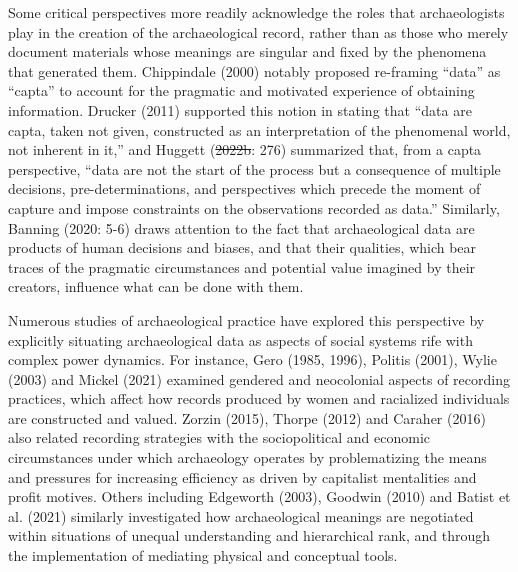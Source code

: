 \documentclass[
]{article}
\makeatletter
\providecommand{\DIFadd}[1]{{\protect\color{blue}\uwave{#1}}} %
\providecommand{\DIFdel}[1]{{\protect\color{red}\sout{#1}}} %
\providecommand{\DIFaddbegin}{} %
\providecommand{\DIFaddend}{} %
\providecommand{\DIFdelbegin}{} %
\providecommand{\DIFdelend}{} %
\newcommand{\DIFscaledelfig}{0.5}
\newlength{\DIFdelgraphicswidth} %
\newlength{\DIFdelgraphicsheight} %
\newcommand{\DIFaddincludegraphics}[2][]{{\color{blue}\fbox{\DIFOincludegraphics[#1]{#2}}}} %
\newcommand{\DIFdelincludegraphics}[2][]{%
\sbox{\DIFdelgraphicsbox}{\DIFOincludegraphics[#1]{#2}}%
\settoboxwidth{\DIFdelgraphicswidth}{\DIFdelgraphicsbox} %
\settoboxtotalheight{\DIFdelgraphicsheight}{\DIFdelgraphicsbox} %
\scalebox{\DIFscaledelfig}{%
\parbox[b]{\DIFdelgraphicswidth}{\usebox{\DIFdelgraphicsbox}\\[-\baselineskip] \rule{\DIFdelgraphicswidth}{0em}}\llap{\resizebox{\DIFdelgraphicswidth}{\DIFdelgraphicsheight}{%
\setlength{\unitlength}{\DIFdelgraphicswidth}%
\begin{picture}(1,1)%
\thicklines\linethickness{2pt} %
{\color[rgb]{1,0,0}\put(0,0){\framebox(1,1){}}}%
{\color[rgb]{1,0,0}\put(0,0){\line( 1,1){1}}}%
{\color[rgb]{1,0,0}\put(0,1){\line(1,-1){1}}}%
\end{picture}%
}\hspace*{3pt}}} %
} %
\DeclareRobustCommand{\DIFaddbegin}{\DIFOaddbegin \let\includegraphics\DIFaddincludegraphics} %
\DeclareRobustCommand{\DIFaddend}{\DIFOaddend \let\includegraphics\DIFOincludegraphics} %
\DeclareRobustCommand{\DIFdelbegin}{\DIFOdelbegin \let\includegraphics\DIFdelincludegraphics} %
\DeclareRobustCommand{\DIFdelend}{\DIFOaddend \let\includegraphics\DIFOincludegraphics} %
\let\sout@orig\sout %
\renewcommand{\sout}[1]{\ifmmode\text{\sout@orig{\ensuremath{#1}}}\else\sout@orig{#1}\fi} %
\makeatother
\begin{document}
Some critical perspectives more readily acknowledge the roles that
archaeologists play in the creation of the archaeological record, rather
than as those who merely document materials whose meanings are singular
and fixed by the phenomena that generated them. Chippindale (2000)
notably proposed re-framing ``data'' as ``capta'' to account for the
pragmatic and motivated experience of obtaining information. Drucker
(2011) supported this notion in stating that ``data are capta, taken not
given, constructed as an interpretation of the phenomenal world, not
inherent in it,'' and Huggett (\DIFdelbegin \DIFdel{2022b}\DIFdelend \DIFaddbegin \DIFadd{2022}\DIFaddend : 276) summarized that, from a capta
perspective, ``data are not the start of the process but a consequence
of multiple decisions, pre-determinations, and perspectives which
precede the moment of capture and impose constraints on the observations
recorded as data.'' Similarly, Banning (2020: 5-6) draws attention to
the fact that archaeological data are products of human decisions and
biases, and that their qualities, which bear traces of the pragmatic
circumstances and potential value imagined by their creators, influence
what can be done with them.

Numerous studies of archaeological practice have explored this
perspective by explicitly situating archaeological data as aspects of
social systems rife with complex power dynamics. For instance, Gero
(1985, 1996), Politis (2001), Wylie (2003) and Mickel (2021) examined
gendered and neocolonial aspects of recording practices, which affect
how records produced by women and racialized individuals are constructed
and valued. Zorzin (2015), Thorpe (2012) and Caraher (2016) also related
recording strategies with the sociopolitical and economic circumstances
under which archaeology operates by problematizing the means and
pressures for increasing efficiency as driven by capitalist mentalities
and profit motives. Others including Edgeworth (2003), Goodwin (2010)
and Batist et al. (2021) similarly investigated how archaeological
meanings are negotiated within situations of unequal understanding and
hierarchical rank, and through the implementation of mediating physical
and conceptual tools.
\end{document}
